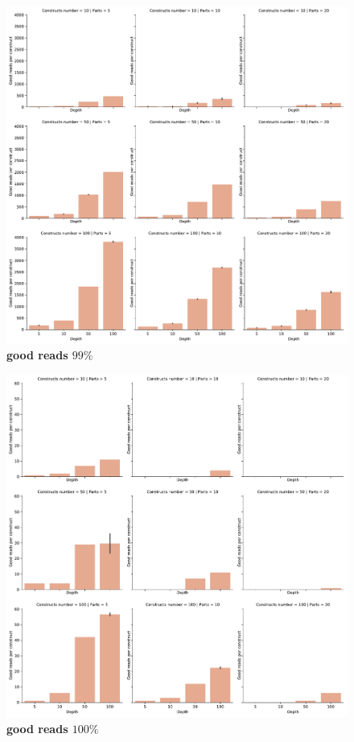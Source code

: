 \documentclass[11pt, a4paper]{article}
\begin{document}
\begin{figure}[ht]
    \begin{center}
    \includegraphics[width=1\textwidth]{../results/images_notebook/v_322/99_good_reads_plot.pdf}
    \end{center}
    \caption{{\bf good reads $99\%$}}
   \label{fig:v_322_good_reads_99}
\end{figure}

\begin{figure}[ht]
    \begin{center}
    \includegraphics[width=1\textwidth]{../results/images_notebook/v_322/100_good_reads_plot.pdf}
    \end{center}
    \caption{{\bf good reads $100\%$}}
   \label{fig:v_322_good_reads_100}
\end{figure}
\end{document}
